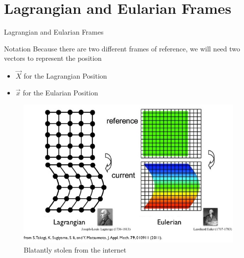 \documentclass{beamer}
\begin{document}
\section{Lagrangian and Eularian Frames}
\begin{frame}{Lagrangian and Eularian Frames}
\begin{block}{Notation}
	Because there are two different frames of reference, we will need
	two vectors to represent the position 
	\begin{itemize}
		\item $\vec{X}$ for the Lagrangian Position
		\item $\vec{x}$ for the Eularian Position
	\end{itemize}		
\end{block}
\begin{figure}[!ht]
	\includegraphics[scale=0.4]{LE2}
	\caption{Blatantly stolen from the internet}
	\label{fig:LE}
\end{figure}
\end{frame}
\end{document}
